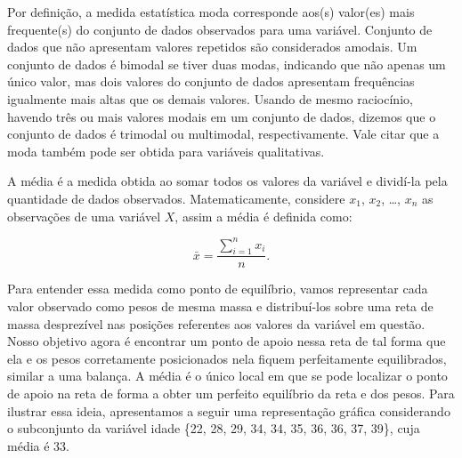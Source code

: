 \documentclass[
  letterpaper,
  DIV=11,
  numbers=noendperiod]{scrreprt}
\begin{document}
Por definição, a medida estatística moda corresponde aos(s) valor(es)
mais frequente(s) do conjunto de dados observados para uma variável.
Conjunto de dados que não apresentam valores repetidos são considerados
amodais. Um conjunto de dados é bimodal se tiver duas modas, indicando
que não apenas um único valor, mas dois valores do conjunto de dados
apresentam frequências igualmente mais altas que os demais valores.
Usando de mesmo raciocínio, havendo três ou mais valores modais em um
conjunto de dados, dizemos que o conjunto de dados é trimodal ou
multimodal, respectivamente. Vale citar que a moda também pode ser
obtida para variáveis qualitativas.

A média é a medida obtida ao somar todos os valores da variável e
dividí-la pela quantidade de dados observados. Matematicamente,
considere \(x_1\), \(x_2\), \ldots, \(x_n\) as observações de uma
variável \(X\), assim a média é definida como:

\begin{equation}
\bar{x} = \frac{\sum_{i = 1}^n x_i}{n}.
\end{equation}

Para entender essa medida como ponto de equilíbrio, vamos representar
cada valor observado como pesos de mesma massa e distribuí-los sobre uma
reta de massa desprezível nas posições referentes aos valores da
variável em questão. Nosso objetivo agora é encontrar um ponto de apoio
nessa reta de tal forma que ela e os pesos corretamente posicionados
nela fiquem perfeitamente equilibrados, similar a uma balança. A média é
o único local em que se pode localizar o ponto de apoio na reta de forma
a obter um perfeito equilíbrio da reta e dos pesos. Para ilustrar essa
ideia, apresentamos a seguir uma representação gráfica considerando o
subconjunto da variável idade \{22, 28, 29, 34, 34, 35, 36, 36, 37,
39\}, cuja média é 33.
\end{document}
